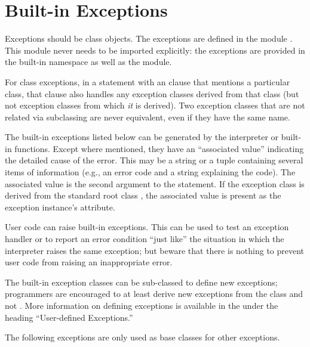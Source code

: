 \section{Built-in Exceptions}



Exceptions should be class objects.  
The exceptions are defined in the module .  This
module never needs to be imported explicitly: the exceptions are
provided in the built-in namespace as well as the 
module.

For class exceptions, in a  statement with
an  clause that mentions a particular
class, that clause also handles any exception classes derived from
that class (but not exception classes from which \emph{it} is
derived).  Two exception classes that are not related via subclassing
are never equivalent, even if they have the same name.

The built-in exceptions listed below can be generated by the
interpreter or built-in functions.  Except where mentioned, they have
an ``associated value'' indicating the detailed cause of the error.
This may be a string or a tuple containing several items of
information (e.g., an error code and a string explaining the code).
The associated value is the second argument to the
 statement.  If the exception class is
derived from the standard root class , the
associated value is present as the exception instance's 
attribute.

User code can raise built-in exceptions.  This can be used to test an
exception handler or to report an error condition ``just like'' the
situation in which the interpreter raises the same exception; but
beware that there is nothing to prevent user code from raising an
inappropriate error.

The built-in exception classes can be sub-classed to define new
exceptions; programmers are encouraged to at least derive new
exceptions from the  class and not
.  More
information on defining exceptions is available in the
 under the heading
``User-defined Exceptions.''


The following exceptions are only used as base classes for other
exceptions.


